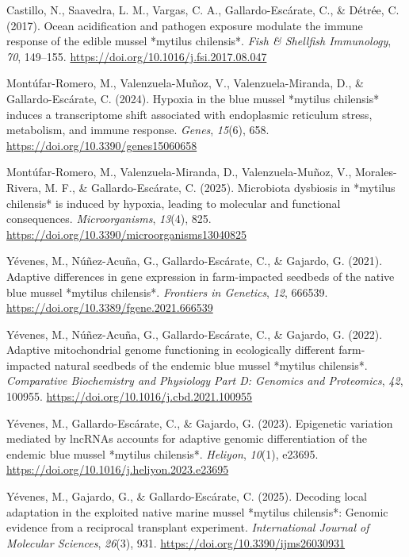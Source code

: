 \documentclass[
]{agujournal2019}
\newlength{\cslhangindent}
\newenvironment{CSLReferences}[2] %
 {\begin{list}{}{%
  \setlength{\itemindent}{0pt}
  \setlength{\leftmargin}{0pt}
  \setlength{\parsep}{0pt}
  \ifodd #1
   \setlength{\leftmargin}{\cslhangindent}
   \setlength{\itemindent}{-1\cslhangindent}
  \fi
  \setlength{\itemsep}{#2\baselineskip}}}
 {\end{list}}
\begin{document}
\label{refs}
\begin{CSLReferences}{1}{0}
Castillo, N., Saavedra, L. M., Vargas, C. A., Gallardo-Escárate, C., \&
Détrée, C. (2017). Ocean acidification and pathogen exposure modulate
the immune response of the edible mussel *mytilus chilensis*. \emph{Fish
\& Shellfish Immunology}, \emph{70}, 149--155.
\url{https://doi.org/10.1016/j.fsi.2017.08.047}

Montúfar-Romero, M., Valenzuela-Muñoz, V., Valenzuela-Miranda, D., \&
Gallardo-Escárate, C. (2024). Hypoxia in the blue mussel *mytilus
chilensis* induces a transcriptome shift associated with endoplasmic
reticulum stress, metabolism, and immune response. \emph{Genes},
\emph{15}(6), 658. \url{https://doi.org/10.3390/genes15060658}

Montúfar-Romero, M., Valenzuela-Miranda, D., Valenzuela-Muñoz, V.,
Morales-Rivera, M. F., \& Gallardo-Escárate, C. (2025). Microbiota
dysbiosis in *mytilus chilensis* is induced by hypoxia, leading to
molecular and functional consequences. \emph{Microorganisms},
\emph{13}(4), 825. \url{https://doi.org/10.3390/microorganisms13040825}

Yévenes, M., Núñez-Acuña, G., Gallardo-Escárate, C., \& Gajardo, G.
(2021). Adaptive differences in gene expression in farm-impacted
seedbeds of the native blue mussel *mytilus chilensis*. \emph{Frontiers
in Genetics}, \emph{12}, 666539.
\url{https://doi.org/10.3389/fgene.2021.666539}

Yévenes, M., Núñez-Acuña, G., Gallardo-Escárate, C., \& Gajardo, G.
(2022). Adaptive mitochondrial genome functioning in ecologically
different farm-impacted natural seedbeds of the endemic blue mussel
*mytilus chilensis*. \emph{Comparative Biochemistry and Physiology Part
D: Genomics and Proteomics}, \emph{42}, 100955.
\url{https://doi.org/10.1016/j.cbd.2021.100955}

Yévenes, M., Gallardo-Escárate, C., \& Gajardo, G. (2023). Epigenetic
variation mediated by lncRNAs accounts for adaptive genomic
differentiation of the endemic blue mussel *mytilus chilensis*.
\emph{Heliyon}, \emph{10}(1), e23695.
\url{https://doi.org/10.1016/j.heliyon.2023.e23695}

Yévenes, M., Gajardo, G., \& Gallardo-Escárate, C. (2025). Decoding
local adaptation in the exploited native marine mussel *mytilus
chilensis*: Genomic evidence from a reciprocal transplant experiment.
\emph{International Journal of Molecular Sciences}, \emph{26}(3), 931.
\url{https://doi.org/10.3390/ijms26030931}

\end{CSLReferences}
\end{document}
